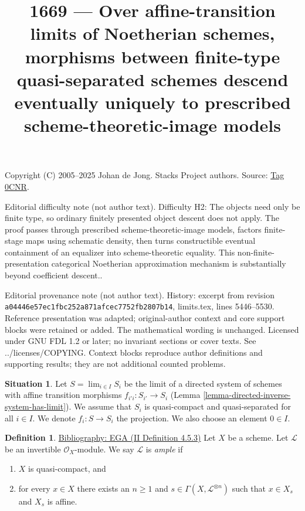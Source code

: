 \documentclass{amsart}
\newenvironment{reference}{\comment}{\endcomment}
\theoremstyle{plain}
\theoremstyle{definition}
\newtheorem{definition}[subsection]{Definition}
\newtheorem{situation}[subsection]{Situation}
\theoremstyle{remark}
\numberwithin{equation}{subsection}
\def\lim{\mathop{\mathrm{lim}}\nolimits}
\begin{document}
\title[Stacks Project, Tag 0CNR]{1669 --- Over affine-transition limits of Noetherian schemes, morphisms between finite-type quasi-separated schemes descend eventually uniquely to prescribed scheme-theoretic-image models}
\maketitle
\noindent Copyright (C) 2005--2025 Johan de Jong. Stacks Project authors. Source: \href{https://stacks.math.columbia.edu/tag/0CNR}{Tag 0CNR}.

\noindent Editorial difficulty note (not author text). Difficulty H2: The objects need only be finite type, so ordinary finitely presented object descent does not apply. The proof passes through prescribed scheme-theoretic-image models, factors finite-stage maps using schematic density, then turns constructible eventual containment of an equalizer into scheme-theoretic equality. This non-finite-presentation categorical Noetherian approximation mechanism is substantially beyond coefficient descent..

\noindent Editorial provenance note (not author text). History: excerpt from revision \texttt{a0444\allowbreak 6e57e\allowbreak c1fbc\allowbreak 252a8\allowbreak 71afc\allowbreak ec775\allowbreak 2fb28\allowbreak 07b14}, limits.tex, lines 5446--5530. Reference presentation was adapted; original-author context and core support blocks were retained or added. The mathematical wording is unchanged. Licensed under GNU FDL 1.2 or later; no invariant sections or cover texts. See ../licenses/COPYING. Context blocks reproduce author definitions and supporting results; they are not additional counted problems.

\begin{situation}
\label{situation-descent}
Let $S = \lim_{i \in I} S_i$ be the limit of a directed system of schemes
with affine transition morphisms $f_{i'i} : S_{i'} \to S_i$
(Lemma \ref{lemma-directed-inverse-system-has-limit}).
We assume that $S_i$ is quasi-compact and quasi-separated for all $i \in I$.
We denote $f_i : S \to S_i$ the projection.
We also choose an element $0 \in I$.
\end{situation}

\begin{definition}
\label{properties-definition-ample}
\begin{reference}
\href{https://stacks.math.columbia.edu/bibliography}{Bibliography: EGA (II Definition 4.5.3)}
\end{reference}
Let $X$ be a scheme.
Let $\mathcal{L}$ be an invertible $\mathcal{O}_X$-module.
We say $\mathcal{L}$ is {\it ample} if
\begin{enumerate}
\item $X$ is quasi-compact, and
\item for every $x \in X$ there exists an $n \geq 1$
and $s \in \Gamma(X, \mathcal{L}^{\otimes n})$ such
that $x \in X_s$ and $X_s$ is affine.
\end{enumerate}
\end{definition}
\end{document}
